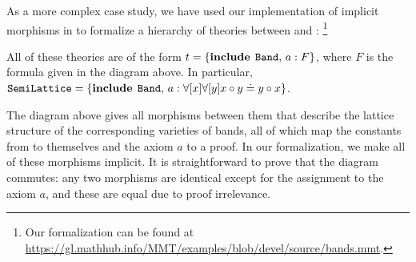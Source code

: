 As a more complex case study, we have used our implementation of implicit morphisms in \mmt to formalize a hierarchy of theories between  and :%
\footnote{Our formalization can be found at \url{https://gl.mathhub.info/MMT/examples/blob/devel/source/bands.mmt}.}
\begin{center}
\end{center}
All of these theories are of the form $t=\{\operatorname{\mathbf{include}}{\;\operatorname{\mathtt{Band}}},\,a: F\}$, where $F$ is the formula given in the diagram above.%
In particular, $\operatorname{\mathtt{SemiLattice}}=\{\operatorname{\mathbf{include}}{\;\operatorname{\mathtt{Band}}},\,a: \forall [x]\forall [y] x\circ y\doteq y\circ x\}$.

The diagram above gives all morphisms between them that describe the lattice structure of the corresponding varieties of bands, all of which map the constants from  to themselves and the axiom $a$ to a proof.
In our formalization, we make all of these morphisms implicit.
It is straightforward to prove that the diagram commutes: any two morphisms are identical except for the assignment to the axiom $a$, and these are equal due to proof irrelevance.

